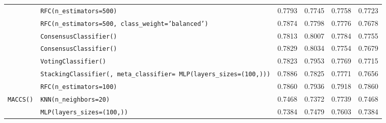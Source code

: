 \begin{table}[H]
{\begin{tabular}{|p{4cm}|p{5cm}|c|c|c|c|}
    	                                                                           & \texttt{RFC(n\_estimators=500)}                                                            & \num{0.7793} & \num{0.7745} & \num{0.7758} &     \num{0.7723}      \\ \cline{2-6}
    	                                                                           & \texttt{RFC(n\_estimators=500, class\_weight='balanced')}                                  & \num{0.7874} & \num{0.7798} & \num{0.7776} &     \num{0.7678}      \\ \cline{2-6}
    	                                                                           & \texttt{ConsensusClassifier(\footnotemark[1])}                                             & \num{0.7813} & \num{0.8007} & \num{0.7784} &     \num{0.7755}      \\ \cline{2-6}
    	\rowcolor{blue!25}                                                         & \texttt{ConsensusClassifier(\footnotemark[2])}                                             & \num{0.7829} & \num{0.8034} & \num{0.7754} &     \num{0.7679}      \\ \cline{2-6}
    	                                                                           & \texttt{VotingClassifier(\footnotemark[1])}                                                & \num{0.7823} & \num{0.7953} & \num{0.7769} &     \num{0.7715}      \\ \cline{2-6}
    	                                                                           & \texttt{StackingClassifier(\footnotemark[1], meta\_classifier= MLP(layers\_sizes=(100,)))} & \num{0.7886} & \num{0.7825} & \num{0.7771} &     \num{0.7656}      \\ \cline{2-6}
    	\rowcolor{blue!25}                                                         & \texttt{RFC(n\_estimators=100)}\footnotemark[3]                                            & \num{0.7860} & \num{0.7936} & \num{0.7918} &     \num{0.7860}      \\ \hline\hline
    	\multirow{3}{4cm}{\texttt{MACCS()}}                                        & \texttt{KNN(n\_neighbors=20)}                                                              & \num{0.7468} & \num{0.7372} & \num{0.7739} &     \num{0.7468}      \\ \cline{2-6}
    	                                                                           & \texttt{MLP(layers\_sizes=(100,))}                                                         & \num{0.7384} & \num{0.7479} & \num{0.7603} &     \num{0.7384}      \\ \cline{2-6}

\end{tabular}}
\end{table}
